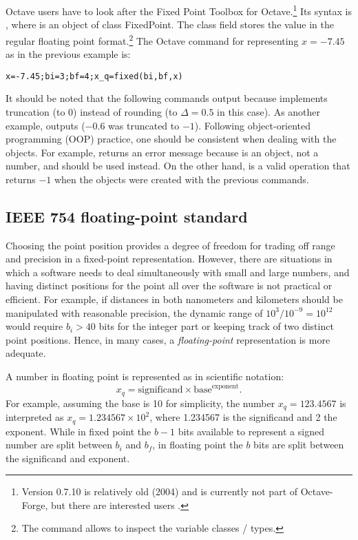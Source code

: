 Octave users have to look after the Fixed Point Toolbox for Octave.\footnote{Version 0.7.10 is relatively old (2004) and is currently not part of Octave-Forge, but there are interested users .}
Its syntax is , where  is an object of class FixedPoint. The class field  stores the value in the regular floating point format.\footnote{The command  allows to inspect the variable classes / types.}
The Octave command for representing $x=-7.45$ as in the previous example is:
\begin{lstlisting}
x=-7.45;bi=3;bf=4;x_q=fixed(bi,bf,x)
\end{lstlisting}
It should be noted that the following commands  output  because  implements truncation (to 0) instead of rounding (to $\Delta=0.5$ in this case). As another example,  outputs  ($-0.6$ was truncated to $-1$). Following object-oriented programming (OOP) practice, one should be consistent when dealing with the objects. For example,  returns an error message because  is an object, not a number, and  should be used instead. On the other hand,  is a valid operation that returns $-1$ when the objects were created with the previous commands.
\eExample 

\subsection{IEEE 754 floating-point standard}

Choosing the point position provides a degree of freedom for trading off range and precision in a fixed-point representation. However, there are situations in which a software needs to deal simultaneously with small and large numbers, and having distinct positions for the point all over the software is not practical or efficient. For example, if distances in both nanometers and kilometers should be manipulated with reasonable precision, the dynamic range of $10^3/10^{-9}=10^{12}$ would require $b_i > 40$ bits for the integer part or keeping track of two distinct point positions. Hence, in many cases, a \emph{floating-point} representation is more adequate. 

A number in floating point is represented as in scientific notation:
\begin{equation}
x_q = \textrm{significand} \times \textrm{base}^{\textrm{exponent}}.
\label{eq:floatingPoint}
\end{equation}
For example, assuming the base is 10 for simplicity, the number $x_q=123.4567$ is interpreted as $x_q=1.234567 \times 10^{2}$, where 1.234567 is the significand and 2 the exponent. While in fixed point the $b-1$ bits available to represent a signed number are split between $b_i$ and $b_f$, in floating point the $b$ bits are split between the significand and exponent. 

